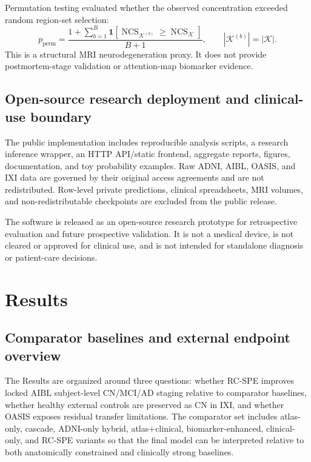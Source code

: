 \documentclass[12pt,a4paper]{article}
\begin{document}
Permutation testing evaluated whether the observed concentration exceeded random region-set selection:
\begin{equation}
p_{\mathrm{perm}} =
\frac{1+\sum_{b=1}^{B}
\mathbf{1}
\left[
\operatorname{NCS}_{\mathcal{K}^{(b)}}
\geq
\operatorname{NCS}_{\mathcal{K}}
\right]}
{B+1},
\qquad
|\mathcal{K}^{(b)}|=|\mathcal{K}|.
\label{eq:permutation}
\end{equation}
This is a structural MRI neurodegeneration proxy. It does not provide postmortem-stage validation or attention-map biomarker evidence.

\subsection{Open-source research deployment and clinical-use boundary}
\label{sec:deployment}

The public implementation includes reproducible analysis scripts, a research inference wrapper, an HTTP API/static frontend, aggregate reports, figures, documentation, and toy probability examples. Raw ADNI, AIBL, OASIS, and IXI data are governed by their original access agreements and are not redistributed. Row-level private predictions, clinical spreadsheets, MRI volumes, and non-redistributable checkpoints are excluded from the public release.

The software is released as an open-source research prototype for retrospective evaluation and future prospective validation. It is not a medical device, is not cleared or approved for clinical use, and is not intended for standalone diagnosis or patient-care decisions.


\section{Results}
\label{sec:results}

\subsection{Comparator baselines and external endpoint overview}
\label{sec:external_overview}

The Results are organized around three questions: whether RC-SPE improves locked AIBL subject-level CN/MCI/AD staging relative to comparator baselines, whether healthy external controls are preserved as CN in IXI, and whether OASIS exposes residual transfer limitations. The comparator set includes atlas-only, cascade, ADNI-only hybrid, atlas+clinical, biomarker-enhanced, clinical-only, and RC-SPE variants so that the final model can be interpreted relative to both anatomically constrained and clinically strong baselines.
\end{document}
